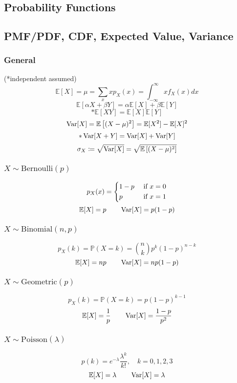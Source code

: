 \documentclass[10pt,landscape,a4paper]{article}
\begin{document}
\begin{multicols}{4}
\section*{Probability Functions}
\subsection*{PMF/PDF, CDF, Expected Value, Variance}
\subsubsection*{General} 
(*independent assumed)
\[
  \mathbb{E}[X] = \mu = \sum_{x} xp_X (x) = \int_{-\infty}^{\infty} xf_X(x)dx
\]
\[
  \mathbb{E}[\alpha X + \beta Y] = \alpha \mathbb{E}[X] + \beta \mathbb{E}[Y]
\]
\[
  *\mathbb{E}[XY] = \mathbb{E}[X]\mathbb{E}[Y]
\]
\[
  \operatorname{Var}[X] = \mathbb{E}\left[(X - \mu)^2 \right] = \mathbb{E}[X^2] - \mathbb{E}[X]^2
\]
\[
  *\operatorname{Var}[X + Y] = \operatorname{Var}[X] + \operatorname{Var}[Y]
\]
\[
  \sigma_X \coloneqq \sqrt{\operatorname{Var}[X]} =  \sqrt{\mathbb{E}\left[(X - \mu)^2 \right]} 
\]

\subsubsection*{\(X \sim \text{Bernoulli}(p)\)}
\[
  p_X (x) = \begin{dcases}
    1 - p &\text{ if } x = 0\\
    p &\text{ if } x = 1
  \end{dcases}
\]
\[
  \mathbb{E}[X] = p \quad\quad \operatorname{Var}[X] = p(1 - p)
\]

\subsubsection*{\(X \sim \text{Binomial}(n, p)\)}
\[
  p_X (k) = \mathbb{P}(X = k) = \binom{n}{k}p^k(1 - p)^{n-k}
\]
\[
  \mathbb{E}[X] = np \quad\quad \operatorname{Var}[X] = np(1 - p)
\]

\subsubsection*{\(X \sim \text{Geometric}(p)\)}
\[
  p_X (k) = \mathbb{P}(X = k) = p(1 - p)^{k-1} 
\]
\[
  \mathbb{E}[X] = \frac{1}{p} \quad\quad \operatorname{Var}[X] = \frac{1 - p}{p^{2}}
\]

\subsubsection*{\(X \sim \text{Poisson}(\lambda)\)}
\[
  p(k) = e^{-\lambda}\dfrac{\lambda^k}{k!}, \quad k = 0, 1, 2, 3
\]
\[
  \mathbb{E}[X] = \lambda \quad\quad \operatorname{Var}[X] = \lambda 
\]


\end{multicols}
\end{document}

